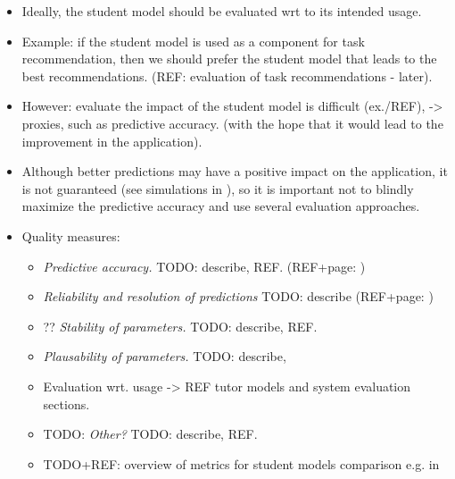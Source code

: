 \begin{itemize}
\item Ideally, the student model should be evaluated wrt to its intended usage.
\item Example: if the student model is used as a component for task recommendation,
 then we should prefer the student model that leads to the best recommendations.
 (REF: evaluation of task recommendations - later).
\item However: evaluate the impact of the student model is difficult (ex./REF),
  -> proxies, such as predictive accuracy.
  (with the hope that it would lead to the improvement in the application).
\item Although better predictions may have a positive impact on the application,
  it is not guaranteed (see simulations in \cite{evaluation-leopard}),
  so it is important not to blindly maximize the predictive accuracy
  and use several evaluation approaches.

\item Quality measures:
\begin{itemize}
\item \emph{Predictive accuracy.}
  TODO: describe, REF.
  (REF+page: \cite{pelanek-evaluation-student-models})
\item \emph{Reliability and resolution of predictions}
  TODO: describe
  (REF+page: \cite{pelanek-evaluation-student-models})
\item ?? \emph{Stability of parameters.}
  TODO: describe, REF.
\item \emph{Plausability of parameters.}
  TODO: describe, \cite{learner-models-integration-skills}
\item Evaluation wrt. usage -> REF tutor models and system evaluation sections.
\item TODO: \emph{Other?}
  TODO: describe, REF.
\item TODO+REF: overview of metrics for student models comparison e.g. in
  \cite{pelanek-evaluation-student-models}

\end{itemize}


\end{itemize}
